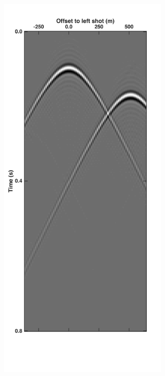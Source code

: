 
\begin{figure}
	\centering
	\begin{subfigure}[t]{0.25\textwidth}
		\centering
		\includegraphics[width=0.925\textwidth]{Plots/Mahdad/30iter/Pseudo-DeblendedCSG_sh2}	

\end{subfigure}
\end{figure}
